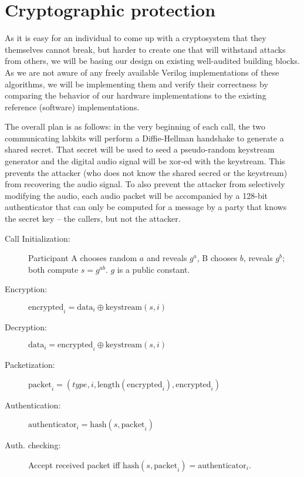 \documentclass[a4paper]{article}
\begin{document}
\section{Cryptographic protection}

As it is easy for an individual to come up with a cryptosystem that they
themselves cannot break, but harder to create one that will withstand attacks
from others, we will be basing our design on existing well-audited building
blocks. As we are not aware of any freely available Verilog implementations of
these algorithms, we will be implementing them and verify their correctness by
comparing the behavior of our hardware implementations to the existing reference
(software) implementations.

The overall plan is as follows: in the very beginning of each call, the two
communicating labkits will perform a Diffie-Hellman handshake to generate a
shared secret. That secret will be used to seed a pseudo-random keystream
generator and the digital audio signal will be xor-ed with the keystream.
This prevents the attacker (who does not know the shared secred or the
keystream) from recovering the audio signal. To also prevent the attacker from
selectively modifying the audio, each audio packet will be accompanied by a
128-bit authenticator that can only be computed for a message by a party that
knows the secret key -- the callers, but not the attacker.

\begin{description}
  \item[Call Initialization:] Participant A chooses random $a$ and reveals $g^a$,
	  B chooses $b$, reveals $g^b$; both compute $s=g^{ab}$. $g$ is a public constant.
  \item[Encryption:] $\text{encrypted}_i = \text{data}_i \mathbin{\oplus} \text{keystream}(s,i)$
  \item[Decryption:] $\text{data}_i = \text{encrypted}_i \mathbin{\oplus} \text{keystream}(s,i)$
  \item[Packetization:] $\text{packet}_i = \left(type, i, \text{length}(\text{encrypted}_i), \text{encrypted}_i\right)$
  \item[Authentication:] $\text{authenticator}_i = \text{hash}(s, \text{packet}_i)$
  \item[Auth. checking:] Accept received packet iff $\text{hash}(s, \text{packet}_i) = \text{authenticator}_i$.
\end{description}
\end{document}
